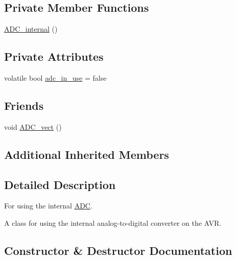\subsection*{Private Member Functions}
\begin{DoxyCompactItemize}
\item 
\hyperlink{class_a_d_c__internal_a4a34ce3ab980b7ab37672153c86d229a}{A\+D\+C\+\_\+internal} ()
\end{DoxyCompactItemize}
\subsection*{Private Attributes}
\begin{DoxyCompactItemize}
\item 
volatile bool \hyperlink{class_a_d_c__internal_a7313da9fa620eae7be708a58d35dbe71}{adc\+\_\+in\+\_\+use} = false
\end{DoxyCompactItemize}
\subsection*{Friends}
\begin{DoxyCompactItemize}
\item 
void \hyperlink{class_a_d_c__internal_a7fd45f1c13cbbf59c3e1ce84deca2e01}{A\+D\+C\+\_\+vect} ()
\end{DoxyCompactItemize}
\subsection*{Additional Inherited Members}


\subsection{Detailed Description}
For using the internal \hyperlink{class_a_d_c}{A\+DC}. 

A class for using the internal analog-\/to-\/digital converter on the A\+VR. 

\subsection{Constructor \& Destructor Documentation}
\hypertarget{class_a_d_c__internal_a4a34ce3ab980b7ab37672153c86d229a}{}\label{class_a_d_c__internal_a4a34ce3ab980b7ab37672153c86d229a} 
